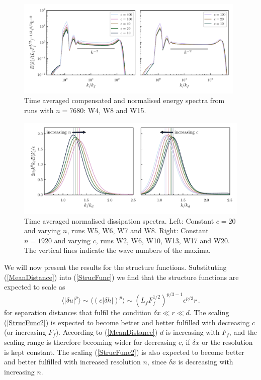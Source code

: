 \documentclass{jfm}
\newcommand{\meane}[1]{\langle #1 \rangle}
\begin{document}
\begin{figure}
\centerline{\includegraphics[width=11cm]{../Pyfig/fig_spectra}}
\caption{Time averaged compensated and normalised energy spectra
from runs with $ n = 7680 $: W4, W8 and W15.}
\label{fig_spectra_c40}
\end{figure}

\begin{figure}
\centerline{\includegraphics[width=13cm]{../Pyfig/fig_diss_spectra}}
\caption{Time averaged normalised dissipation spectra. Left: Constant $ c = 20 $ and varying $ n $, runs  W5, W6, W7 and W8. Right: Constant $ n= 1920 $ and varying $ c $, runs W2, W6, W10, W13, W17 and W20. The vertical lines indicate the wave numbers of the maxima.}
\label{fig_disspectra}
\end{figure}



We will now present the results for the structure functions. Substituting
(\ref{MeanDistance}) into (\ref{StrucFunc}) we find that the structure
functions are expected to scale as
\begin{equation} \label{StrucFunc2}
\meane{|\delta u |^p}  \sim \meane{(c|\delta h |)^p} \sim  (L_f F_f^{1/2})^{p/3-1}  \epsilon^{p/3}  r  \, .
\end{equation}
for separation distances that fulfil the condition $ \delta x \ll r \ll d $.
The scaling (\ref{StrucFunc2}) is
expected to become better and better fulfilled with decreasing $ c $ (or
increasing $ F_f $). According to (\ref{MeanDistance})
$ d $ is increasing with $ F_f $, and the scaling range is therefore becoming
wider for decreasing $ c $, if $ \delta x $ or the resolution  is kept
constant. The scaling
(\ref{StrucFunc2}) is also expected to become better and better fulfilled with
increased resolution $ n $, since $ \delta x $ is decreasing with increasing $
n $.
\end{document}
